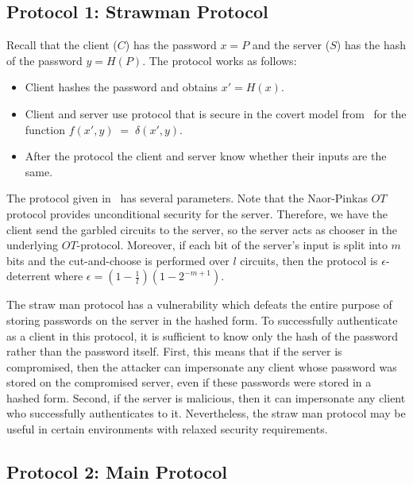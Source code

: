 \subsection{Protocol 1: Strawman Protocol}
\label{subsec:ssh-protocol-1}

Recall that the client ($C$) has the password $x=P$ and the server
($S$) has the hash of the password $y=H(P)$. The protocol works as
follows:
\begin{itemize}
\item Client hashes the password and obtains $x'=H(x)$.
\item Client and server use protocol that is secure in the covert
model from~\cite[Section 6.2]{aumannlindell} for the function $f(x',y)
\; = \; \delta (x',y)$.
\item After the protocol the client and server know whether their
inputs are the same.
\end{itemize}
The protocol given in~\cite{aumannlindell} has several
parameters. Note that the Naor-Pinkas $OT$ protocol provides
unconditional security for the server. Therefore, we have the client
send the garbled circuits to the server, so the server acts as chooser
in the underlying $OT$-protocol. Moreover, if each bit of the server's
input is split into $m$ bits and the cut-and-choose is performed over
$l$ circuits, then the protocol is $\epsilon$-deterrent where
$\epsilon = (1 - \frac{1}{l}) (1 - 2^{-m+1})$.

The straw man protocol has a vulnerability which defeats the entire
purpose of storing passwords on the server in the hashed form.  To
successfully authenticate as a client in this protocol, it is
sufficient to know only the hash of the password rather than the
password itself.  First, this means that if the server is compromised,
then the attacker can impersonate any client whose password was stored
on the compromised server, even if these passwords were stored in a
hashed form.  Second, if the server is malicious, then it can
impersonate any client who successfully authenticates to it. 
Nevertheless, the straw man protocol may be useful in certain
environments with relaxed security requirements.



\subsection{Protocol 2: Main Protocol}
\label{sect:mainproto}

